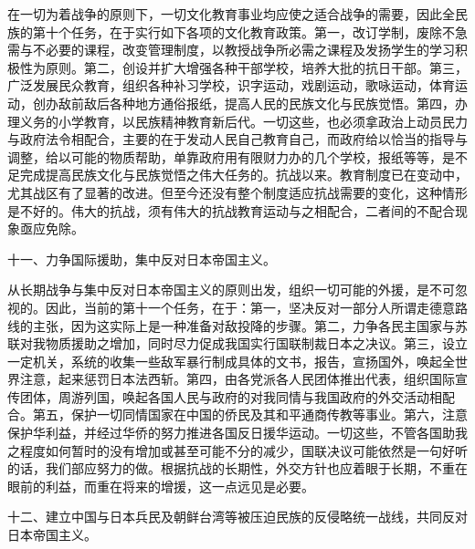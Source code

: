 在一切为着战争的原则下，一切文化教育事业均应使之适合战争的需要，因此全民族的第十个任务，在于实行如下各项的文化教育政策。第一，改订学制，废除不急需与不必要的课程，改变管理制度，以教授战争所必需之课程及发扬学生的学习积极性为原则。第二，创设并扩大增强各种干部学校，培养大批的抗日干部。第三，广泛发展民众教育，组织各种补习学校，识字运动，戏剧运动，歌咏运动，体育运动，创办敌前敌后各种地方通俗报纸，提高人民的民族文化与民族觉悟。第四，办理义务的小学教育，以民族精神教育新后代。一切这些，也必须拿政治上动员民力与政府法令相配合，主要的在于发动人民自己教育自己，而政府给以恰当的指导与调整，给以可能的物质帮助，单靠政府用有限财力办的几个学校，报纸等等，是不足完成提高民族文化与民族觉悟之伟大任务的。抗战以来。教育制度已在变动中，尤其战区有了显著的改进。但至今还没有整个制度适应抗战需要的变化，这种情形是不好的。伟大的抗战，须有伟大的抗战教育运动与之相配合，二者间的不配合现象亟应免除。

十一、力争国际援助，集中反对日本帝国主义。

从长期战争与集中反对日本帝国主义的原则出发，组织一切可能的外援，是不可忽视的。因此，当前的第十一个任务，在于：第一，坚决反对一部分人所谓走德意路线的主张，因为这实际上是一种准备对敌投降的步骤。第二，力争各民主国家与苏联对我物质援助之增加，同时尽力促成我国实行国联制裁日本之决议。第三，设立一定机关，系统的收集一些敌军暴行制成具体的文书，报告，宣扬国外，唤起全世界注意，起来惩罚日本法西斩。第四，由各党派各人民团体推出代表，组织国际宣传团体，周游列国，唤起各国人民与政府的对我同情与我国政府的外交活动相配合。第五，保护一切同情国家在中国的侨民及其和平通商传教等事业。第六，注意保护华利益，并经过华侨的努力推进各国反日援华运动。一切这些，不管各国助我之程度如何暂时的没有增加或甚至可能不分的减少，国联决议可能依然是一句好听的话，我们部应努力的做。根据抗战的长期性，外交方针也应着眼于长期，不重在眼前的利益，而重在将来的增援，这一点远见是必要。

十二、建立中国与日本兵民及朝鲜台湾等被压迫民族的反侵略统一战线，共同反对日本帝国主义。

